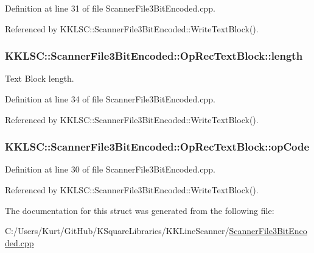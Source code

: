 Definition at line 31 of file Scanner\+File3\+Bit\+Encoded.\+cpp.



Referenced by K\+K\+L\+S\+C\+::\+Scanner\+File3\+Bit\+Encoded\+::\+Write\+Text\+Block().

\subsubsection[{\texorpdfstring{length}{length}}]{ K\+K\+L\+S\+C\+::\+Scanner\+File3\+Bit\+Encoded\+::\+Op\+Rec\+Text\+Block\+::length}\hypertarget{struct_scanner_file3_bit_encoded_1_1_op_rec_text_block_a1f4e6cc7c239ec14fa70fed6c52a6918}{}\label{struct_scanner_file3_bit_encoded_1_1_op_rec_text_block_a1f4e6cc7c239ec14fa70fed6c52a6918}
Text Block length. 

Definition at line 34 of file Scanner\+File3\+Bit\+Encoded.\+cpp.



Referenced by K\+K\+L\+S\+C\+::\+Scanner\+File3\+Bit\+Encoded\+::\+Write\+Text\+Block().

\subsubsection[{\texorpdfstring{op\+Code}{opCode}}]{ K\+K\+L\+S\+C\+::\+Scanner\+File3\+Bit\+Encoded\+::\+Op\+Rec\+Text\+Block\+::op\+Code}\hypertarget{struct_scanner_file3_bit_encoded_1_1_op_rec_text_block_a62b5cddfc0ca9deedc14f5d5b4d47a54}{}\label{struct_scanner_file3_bit_encoded_1_1_op_rec_text_block_a62b5cddfc0ca9deedc14f5d5b4d47a54}


Definition at line 30 of file Scanner\+File3\+Bit\+Encoded.\+cpp.



Referenced by K\+K\+L\+S\+C\+::\+Scanner\+File3\+Bit\+Encoded\+::\+Write\+Text\+Block().



The documentation for this struct was generated from the following file\+:\begin{DoxyCompactItemize}
\item 
C\+:/\+Users/\+Kurt/\+Git\+Hub/\+K\+Square\+Libraries/\+K\+K\+Line\+Scanner/\hyperlink{_scanner_file3_bit_encoded_8cpp}{Scanner\+File3\+Bit\+Encoded.\+cpp}\end{DoxyCompactItemize}
